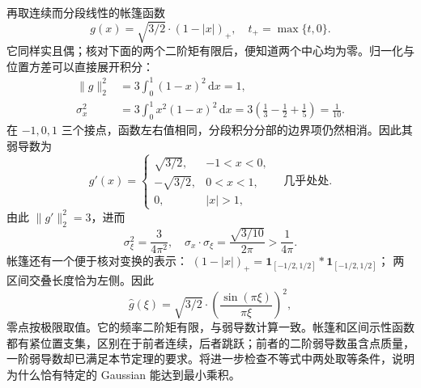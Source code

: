 再取连续而分段线性的帐篷函数
\[
 g(x)=\sqrt{3/2}\cdot(1-|x|)_+,
 \quad t_+=\max\{t,0\}.
\]
它同样实且偶；核对下面的两个二阶矩有限后，便知道两个中心均为零。归一化与位置方差可以直接展开积分：
\[
 \begin{aligned}
 \|g\|_2^2
 &=3\int_0^1(1-x)^2\,\mathrm dx=1,\\
 \sigma_x^2
 &=3\int_0^1x^2(1-x)^2\,\mathrm dx
 =3\left(\frac13-\frac12+\frac15\right)=\frac1{10}.
 \end{aligned}
\]
在 \(-1,0,1\) 三个接点，函数左右值相同，分段积分分部的边界项仍然相消。因此其弱导数为
\[
 g'(x)=
 \begin{cases}
  \sqrt{3/2},&-1<x<0,\\
  -\sqrt{3/2},&0<x<1,\\
  0,&|x|>1,
 \end{cases}
 \quad\text{几乎处处}.
\]
由此 \(\|g'\|_2^2=3\)，进而
\[
 \sigma_\xi^2=\frac3{4\pi^2},
 \quad
 \sigma_x\cdot\sigma_\xi
 =\frac{\sqrt{3/10}}{2\pi}>\frac1{4\pi}.
\]
帐篷还有一个便于核对变换的表示：
\((1-|x|)_+=\mathbf1_{[-1/2,1/2]}*\mathbf1_{[-1/2,1/2]}\)；
两区间交叠长度恰为左侧。因此
\[
 \widehat g(\xi)
 =\sqrt{3/2}\cdot
   \left(\frac{\sin(\pi\xi)}{\pi\xi}\right)^2,
\]
零点按极限取值。它的频率二阶矩有限，与弱导数计算一致。帐篷和区间示性函数都有紧位置支集，区别在于前者连续，后者跳跃；前者的二阶弱导数虽含点质量，一阶弱导数却已满足本节定理的要求。将进一步检查不等式中两处取等条件，说明为什么恰有特定的 Gaussian 能达到最小乘积。
